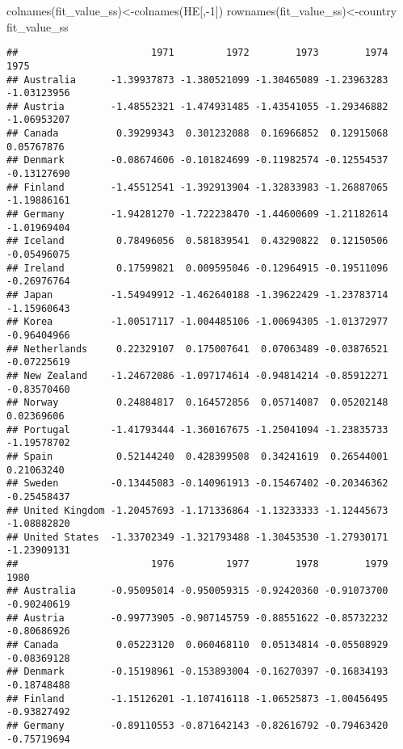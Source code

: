 \documentclass[
]{article}
\newenvironment{Shaded}{\begin{snugshade}}{\end{snugshade}}
\newcommand{\DecValTok}[1]{\textcolor[rgb]{0.00,0.00,0.81}{#1}}
\newcommand{\FunctionTok}[1]{\textcolor[rgb]{0.00,0.00,0.00}{#1}}
\newcommand{\NormalTok}[1]{#1}
\newcommand{\OtherTok}[1]{\textcolor[rgb]{0.56,0.35,0.01}{#1}}
\newcommand{\SpecialCharTok}[1]{\textcolor[rgb]{0.00,0.00,0.00}{#1}}
\begin{document}
\begin{Shaded}
\begin{Highlighting}[]
\FunctionTok{colnames}\NormalTok{(fit\_value\_ss)}\OtherTok{\textless{}{-}}\FunctionTok{colnames}\NormalTok{(HE[,}\SpecialCharTok{{-}}\DecValTok{1}\NormalTok{])}
\FunctionTok{rownames}\NormalTok{(fit\_value\_ss)}\OtherTok{\textless{}{-}}\NormalTok{country}
\NormalTok{fit\_value\_ss}
\end{Highlighting}
\end{Shaded}

\begin{verbatim}
##                       1971         1972        1973        1974        1975
## Australia      -1.39937873 -1.380521099 -1.30465089 -1.23963283 -1.03123956
## Austria        -1.48552321 -1.474931485 -1.43541055 -1.29346882 -1.06953207
## Canada          0.39299343  0.301232088  0.16966852  0.12915068  0.05767876
## Denmark        -0.08674606 -0.101824699 -0.11982574 -0.12554537 -0.13127690
## Finland        -1.45512541 -1.392913904 -1.32833983 -1.26887065 -1.19886161
## Germany        -1.94281270 -1.722238470 -1.44600609 -1.21182614 -1.01969404
## Iceland         0.78496056  0.581839541  0.43290822  0.12150506 -0.05496075
## Ireland         0.17599821  0.009595046 -0.12964915 -0.19511096 -0.26976764
## Japan          -1.54949912 -1.462640188 -1.39622429 -1.23783714 -1.15960643
## Korea          -1.00517117 -1.004485106 -1.00694305 -1.01372977 -0.96404966
## Netherlands     0.22329107  0.175007641  0.07063489 -0.03876521 -0.07225619
## New Zealand    -1.24672086 -1.097174614 -0.94814214 -0.85912271 -0.83570460
## Norway          0.24884817  0.164572856  0.05714087  0.05202148  0.02369606
## Portugal       -1.41793444 -1.360167675 -1.25041094 -1.23835733 -1.19578702
## Spain           0.52144240  0.428399508  0.34241619  0.26544001  0.21063240
## Sweden         -0.13445083 -0.140961913 -0.15467402 -0.20346362 -0.25458437
## United Kingdom -1.20457693 -1.171336864 -1.13233333 -1.12445673 -1.08882820
## United States  -1.33702349 -1.321793488 -1.30453530 -1.27930171 -1.23909131
##                       1976         1977        1978        1979        1980
## Australia      -0.95095014 -0.950059315 -0.92420360 -0.91073700 -0.90240619
## Austria        -0.99773905 -0.907145759 -0.88551622 -0.85732232 -0.80686926
## Canada          0.05223120  0.060468110  0.05134814 -0.05508929 -0.08369128
## Denmark        -0.15198961 -0.153893004 -0.16270397 -0.16834193 -0.18748488
## Finland        -1.15126201 -1.107416118 -1.06525873 -1.00456495 -0.93827492
## Germany        -0.89110553 -0.871642143 -0.82616792 -0.79463420 -0.75719694

\end{verbatim}
\end{document}
